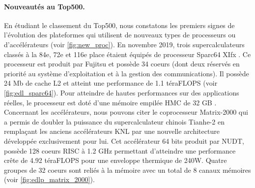         \paragraph{Nouveautés au Top500.} En étudiant le classement du Top500, nous constatons les premiers signes de l'évolution des plateformes qui utilisent de nouveaux types de processeurs ou d'accélérateurs (voir \autoref{fig:new_proc}). En novembre 2019, trois supercalculateurs classés à la 84e, 72e et 116e place étaient équipés de processeur Sparc64 XIfx \cite{Yoshida2018}. Ce processeur est produit par Fujitsu et possède 34 coeurs (dont deux réservés en priorité au système d'exploitation et à la gestion des communications). Il possède 24 Mb de cache L2 et  atteint une performance de 1.1 téraFLOPS (voir \autoref{fig:edl_sparc64}). Pour atteindre de hautes performances sur des applications réelles, le processeur est doté d'une mémoire empilée HMC de 32 GB \cite{Garg2017}. Concernant les accélérateurs, nous pouvons citer le coprocesseur Matrix-2000 qui a permis de doubler la puissance du supercalculateur chinois Tianhe-2 en remplaçant les anciens accélérateurs KNL par une nouvelle architecture développée exclusivement pour lui. Cet accélérateur 64 bits produit par NUDT, possède 128 coeurs RISC à 1.2 GHz permettant d'atteindre une performance crête de 4.92 téraFLOPS pour une enveloppe thermique de 240W. Quatre groupes de 32 coeurs sont reliés à la mémoire avec un total de 8 canaux mémoires (voir \autoref{fig:edlp_matrix_2000}). 
        
